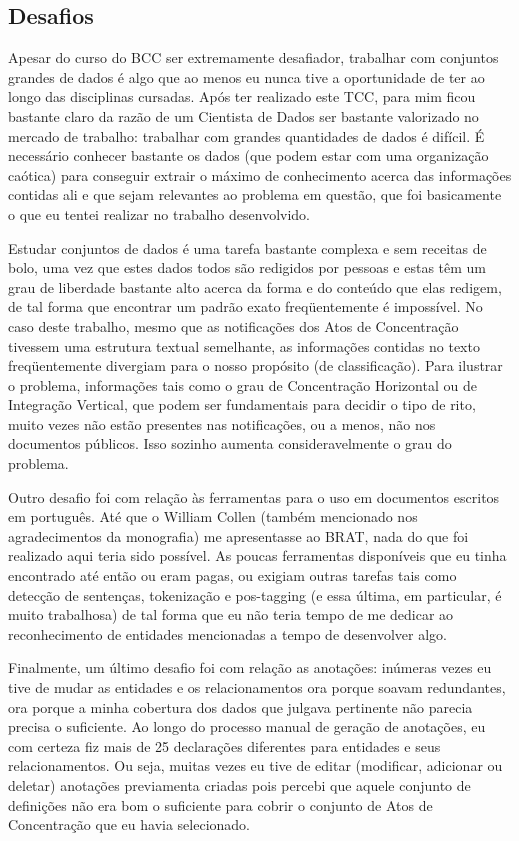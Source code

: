 \documentclass[11pt]{report}
\begin{document}
\subsection*{Desafios}

\indent\indent Apesar do curso do BCC ser extremamente desafiador, trabalhar com conjuntos grandes de dados é algo que ao menos eu nunca tive a oportunidade
de ter ao longo das disciplinas cursadas. Após ter realizado este TCC, para mim ficou bastante claro da razão de um Cientista de Dados ser bastante valorizado
no mercado de trabalho: trabalhar com grandes quantidades de dados é difícil. É necessário conhecer bastante os dados (que podem estar com uma organização
caótica) para conseguir extrair o máximo de conhecimento acerca das informações contidas ali e que sejam relevantes ao problema em questão, que foi basicamente
o que eu tentei realizar no trabalho desenvolvido.

Estudar conjuntos de dados é uma tarefa bastante complexa e sem receitas de bolo, uma vez que estes dados todos são redigidos por pessoas e estas têm um grau de
liberdade bastante alto acerca da forma e do conteúdo que elas redigem, de tal forma que encontrar um padrão exato freqüentemente é impossível. No caso deste trabalho,
mesmo que as notificações dos Atos de Concentração tivessem uma estrutura textual semelhante, as informações contidas no texto freqüentemente divergiam para o nosso
propósito (de classificação). Para ilustrar o problema, informações tais como o grau de Concentração Horizontal ou de Integração Vertical, que podem ser
fundamentais para decidir o tipo de rito, muito vezes não estão presentes nas notificações, ou a menos, não nos documentos públicos. Isso sozinho aumenta consideravelmente
o grau do problema.

Outro desafio foi com relação às ferramentas para o uso em documentos escritos em português. Até que o William Collen (também mencionado nos agradecimentos da monografia) me apresentasse
ao BRAT, nada do que foi realizado aqui teria sido possível. As poucas ferramentas disponíveis que eu tinha encontrado até então ou eram pagas, ou exigiam outras tarefas
tais como detecção de sentenças, tokenização e pos-tagging (e essa última, em particular, é muito trabalhosa) de tal forma que eu não teria tempo de me dedicar ao
reconhecimento de entidades mencionadas a tempo de desenvolver algo.

Finalmente, um último desafio foi com relação as anotações: inúmeras vezes eu tive de mudar as entidades e os relacionamentos ora porque soavam redundantes, ora porque
a minha cobertura dos dados que julgava pertinente não parecia precisa o suficiente. Ao longo do processo manual de geração de anotações, eu com certeza fiz mais de
25 declarações diferentes para entidades e seus relacionamentos. Ou seja, muitas vezes eu tive de editar (modificar, adicionar ou deletar) anotações previamenta criadas pois
percebi que aquele conjunto de definições não era bom o suficiente para cobrir o conjunto de Atos de Concentração que eu havia selecionado.
\end{document}
